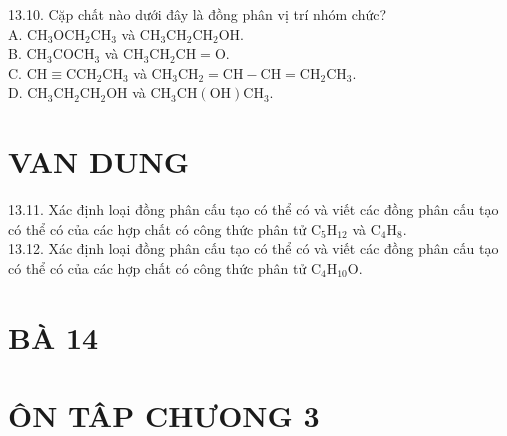 \documentclass[10pt]{article}
\begin{document}
13.10. Cặp chất nào dưới đây là đồng phân vị trí nhóm chức?\\
A. $\mathrm{CH}_{3} \mathrm{OCH}_{2} \mathrm{CH}_{3}$ và $\mathrm{CH}_{3} \mathrm{CH}_{2} \mathrm{CH}_{2} \mathrm{OH}$.\\
B. $\mathrm{CH}_{3} \mathrm{COCH}_{3}$ và $\mathrm{CH}_{3} \mathrm{CH}_{2} \mathrm{CH}=\mathrm{O}$.\\
C. $\mathrm{CH} \equiv \mathrm{CCH}_{2} \mathrm{CH}_{3}$ và $\mathrm{CH}_{3} \mathrm{CH}_{2}=\mathrm{CH}-\mathrm{CH}=\mathrm{CH}_{2} \mathrm{CH}_{3}$.\\
D. $\mathrm{CH}_{3} \mathrm{CH}_{2} \mathrm{CH}_{2} \mathrm{OH}$ và $\mathrm{CH}_{3} \mathrm{CH}(\mathrm{OH}) \mathrm{CH}_{3}$.

\section*{VAN DUNG}
13.11. Xác định loại đồng phân cấu tạo có thể có và viết các đồng phân cấu tạo có thể có của các hợp chất có công thức phân tử $\mathrm{C}_{5} \mathrm{H}_{12}$ và $\mathrm{C}_{4} \mathrm{H}_{8}$.\\
13.12. Xác định loại đồng phân cấu tạo có thể có và viết các đồng phân cấu tạo có thể có của các hợp chất có công thức phân tử $\mathrm{C}_{4} \mathrm{H}_{10} \mathrm{O}$.

\section*{BÀ 14}
\section*{ÔN TÂP CHƯONG 3}
\end{document}
